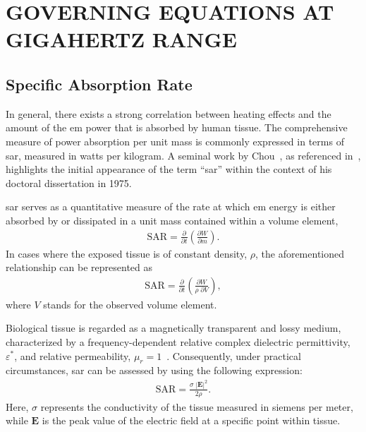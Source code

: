 \cleardoublepage

\chapter{GOVERNING EQUATIONS AT GIGAHERTZ RANGE}
\label{chap:3}

\section{Specific Absorption Rate}
In general, there exists a strong correlation between heating effects and the amount of the \gls{em} power that is absorbed by human tissue.
The comprehensive measure of power absorption per unit mass is commonly expressed in terms of \gls{sar}, measured in watts per kilogram.
A seminal work by Chou~\cite{Chou1975Effects}, as referenced in~\cite{Foster2022Three}, highlights the initial appearance of the term ``\gls{sar}'' within the context of his doctoral dissertation in 1975.

\Gls{sar} serves as a quantitative measure of the rate at which \gls{em} energy is either absorbed by or dissipated in a unit mass contained within a volume element,
\begin{align}
    \label{eqn:sar_1}
    \text{SAR} = \frac{\partial}{\partial t} \left( \frac{\partial W}{\partial m} \right).
\end{align}
In cases where the exposed tissue is of constant density, $\rho$, the aforementioned relationship can be represented as
\begin{align}
    \label{eqn:sar_2}
    \text{SAR} = \frac{\partial}{\partial t} \left( \frac{\partial W}{\rho \; \partial V} \right),
\end{align}
where $V$ stands for the observed volume element.

Biological tissue is regarded as a magnetically transparent and lossy medium, characterized by a frequency-dependent relative complex dielectric permittivity, $\varepsilon^*$, and relative permeability, $\mu_r = 1$~\cite{Sasaki2014Measurement}.
Consequently, under practical circumstances, \gls{sar} can be assessed by using the following expression:
\begin{align}
    \label{eqn:sar_3}
    \text{SAR} = \frac{\sigma \; \left| \mathbf{E} \right|^2}{2 \rho}.
\end{align}
Here, $\sigma$ represents the conductivity of the tissue measured in siemens per meter, while $\mathbf{E}$ is the peak value of the electric field at a specific point within tissue.

